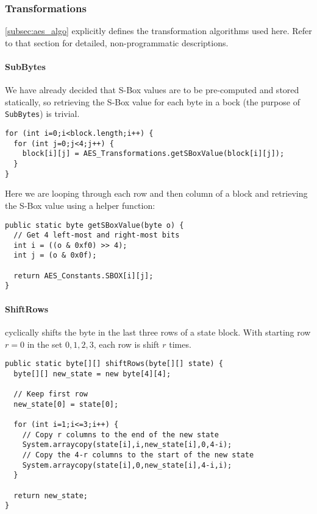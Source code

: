     \subsubsection{Transformations}
    \label{subsubsec:aes_transformations}
    
    \textsection\ref{subsec:aes_algo} explicitly defines the transformation algorithms used here. Refer to that section for detailed, non-programmatic descriptions.
    
    \paragraph{SubBytes}
    
    We have already decided that S-Box values are to be pre-computed and stored statically, so retrieving the S-Box value for each byte in a bock (the purpose of \verb!SubBytes!) is trivial. \\
    
    \begin{lstlisting}
for (int i=0;i<block.length;i++) {
  for (int j=0;j<4;j++) {
    block[i][j] = AES_Transformations.getSBoxValue(block[i][j]);
  }
}
\end{lstlisting}

    Here we are looping through each row and then column of a block and retrieving the S-Box value using a helper function: \\
    
    \begin{lstlisting}
public static byte getSBoxValue(byte o) {
  // Get 4 left-most and right-most bits
  int i = ((o & 0xf0) >> 4);
  int j = (o & 0x0f);

  return AES_Constants.SBOX[i][j];
}
\end{lstlisting}
    
    \paragraph{ShiftRows}
    
    cyclically shifts the byte in the last three rows of a state block. With starting row $r = 0$ in the set ${0,1,2,3}$, each row is shift $r$ times. \\
    
    \begin{lstlisting}
public static byte[][] shiftRows(byte[][] state) {
  byte[][] new_state = new byte[4][4];
		
  // Keep first row
  new_state[0] = state[0];
		
  for (int i=1;i<=3;i++) {
    // Copy r columns to the end of the new state
    System.arraycopy(state[i],i,new_state[i],0,4-i);
    // Copy the 4-r columns to the start of the new state
    System.arraycopy(state[i],0,new_state[i],4-i,i);
  }
		
  return new_state;
}
\end{lstlisting}
    
